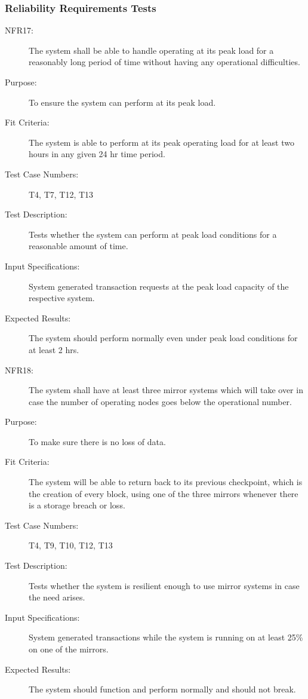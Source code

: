 \documentclass[a4paper,twoside,phd]{BYUPhys}
\begin{document}
\subsubsection{Reliability Requirements Tests}
\begin{description}
\item[NFR17:] The system shall be able to handle operating at its peak load for a reasonably long period of time without having any operational difficulties.
\item[Purpose:] To ensure the system can perform at its peak load.
\item[Fit Criteria:] The system is able to perform at its peak operating load for at least two hours in any given 24 hr time period.
\item[Test Case Numbers:] T4, T7, T12, T13
\item[Test Description:] Tests whether the system can perform at peak load conditions for a reasonable amount of time.
\item[Input Specifications:] System generated transaction requests at the peak load capacity of the respective system.
\item[Expected Results:] The system should perform normally even under peak load conditions for at least 2 hrs.

\item[NFR18:] The system shall have at least three mirror systems which will take over in case the number of operating nodes goes below the operational number.
\item[Purpose:] To make sure there is no loss of data.
\item[Fit Criteria:] The system will be able to return back to its previous checkpoint, which is the creation of every block, using one of the three mirrors whenever there is a storage breach or loss.
\item[Test Case Numbers:] T4, T9, T10, T12, T13
\item[Test Description:] Tests whether the system is resilient enough to use mirror systems in case the need arises.
\item[Input Specifications:] System generated transactions while the system is running on at least 25\% on one of the mirrors.
\item[Expected Results:] The system should function and perform normally and should not break.


\end{description}
\end{document}
